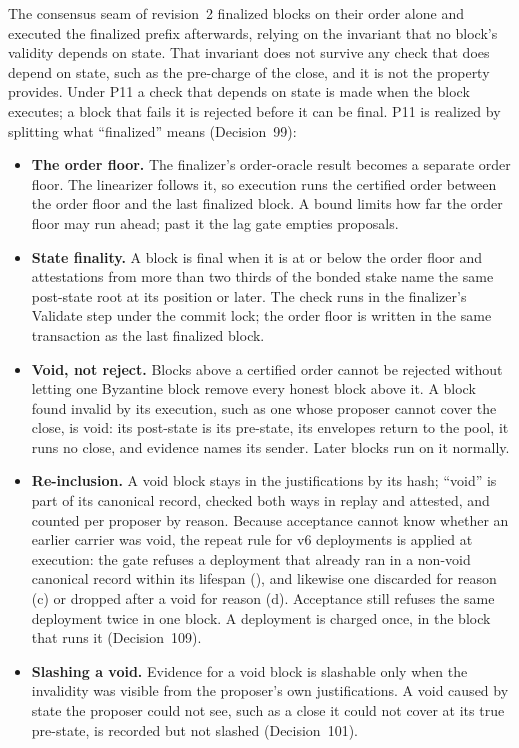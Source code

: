 \documentclass[11pt]{article}
\newcommand{\code}{\path}
\begin{document}
The consensus seam of revision~2 finalized blocks on their order alone and executed the finalized prefix afterwards, relying on the invariant that no block's validity depends on state. That invariant does not survive any check that does depend on state, such as the pre-charge of the close, and it is not the property \code{dev} provides. Under P11 a check that depends on state is made when the block executes; a block that fails it is rejected before it can be final. P11 is realized by splitting what ``finalized'' means (Decision~99):
\begin{itemize}
\item \textbf{The order floor.} The finalizer's order-oracle result becomes a separate order floor. The linearizer follows it, so execution runs the certified order between the order floor and the last finalized block. A bound \code{max\_unattested} limits how far the order floor may run ahead; past it the lag gate empties proposals.
\item \textbf{State finality.} A block is final when it is at or below the order floor and attestations from more than two thirds of the bonded stake name the same post-state root at its position or later. The check runs in the finalizer's Validate step under the commit lock; the order floor is written in the same transaction as the last finalized block.
\item \textbf{Void, not reject.} Blocks above a certified order cannot be rejected without letting one Byzantine block remove every honest block above it. A block found invalid by its execution, such as one whose proposer cannot cover the close, is void: its post-state is its pre-state, its envelopes return to the pool, it runs no close, and evidence names its sender. Later blocks run on it normally.
\item \textbf{Re-inclusion.} A void block stays in the justifications by its hash; ``void'' is part of its canonical record, checked both ways in replay and attested, and counted per proposer by reason. Because acceptance cannot know whether an earlier carrier was void, the repeat rule for v6 deployments is applied at execution: the gate refuses a deployment that already ran in a non-void canonical record within its lifespan (\code{AlreadyIncluded}), and likewise one discarded for reason (c) or dropped after a void for reason (d). Acceptance still refuses the same deployment twice in one block. A deployment is charged once, in the block that runs it (Decision~109).
\item \textbf{Slashing a void.} Evidence for a void block is slashable only when the invalidity was visible from the proposer's own justifications. A void caused by state the proposer could not see, such as a close it could not cover at its true pre-state, is recorded but not slashed (Decision~101).

\end{itemize}
\end{document}
